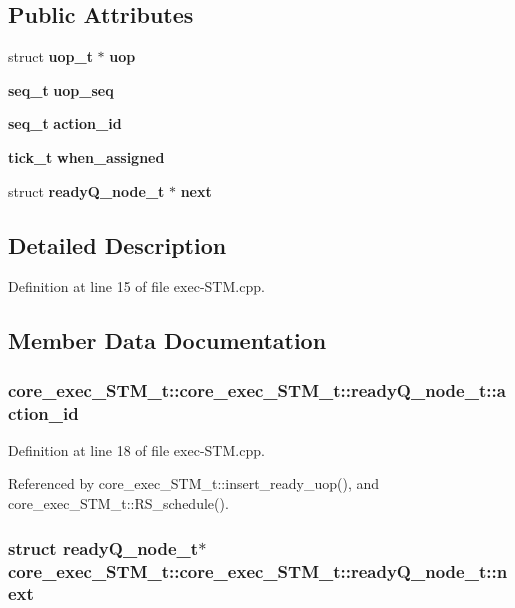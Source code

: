 \subsection*{Public Attributes}
\begin{CompactItemize}
\item 
struct {\bf uop\_\-t} $\ast$ {\bf uop}
\item 
{\bf seq\_\-t} {\bf uop\_\-seq}
\item 
{\bf seq\_\-t} {\bf action\_\-id}
\item 
{\bf tick\_\-t} {\bf when\_\-assigned}
\item 
struct {\bf readyQ\_\-node\_\-t} $\ast$ {\bf next}
\end{CompactItemize}


\subsection{Detailed Description}


Definition at line 15 of file exec-STM.cpp.

\subsection{Member Data Documentation}
\subsubsection[{action\_\-id}]{ core\_\-exec\_\-STM\_\-t::core\_\-exec\_\-STM\_\-t::readyQ\_\-node\_\-t::action\_\-id}\label{structcore__exec__STM__t_1_1readyQ__node__t_45846cb4cd2fcecc096c46a12347cc32}




Definition at line 18 of file exec-STM.cpp.

Referenced by core\_\-exec\_\-STM\_\-t::insert\_\-ready\_\-uop(), and core\_\-exec\_\-STM\_\-t::RS\_\-schedule().
\subsubsection[{next}]{\setlength{\rightskip}{0pt plus 5cm}struct {\bf readyQ\_\-node\_\-t}$\ast$ core\_\-exec\_\-STM\_\-t::core\_\-exec\_\-STM\_\-t::readyQ\_\-node\_\-t::next\hspace{0.3cm}{\tt  [read]}}\label{structcore__exec__STM__t_1_1readyQ__node__t_a80dfcc9d1b02177ce5976317d41ed03}




